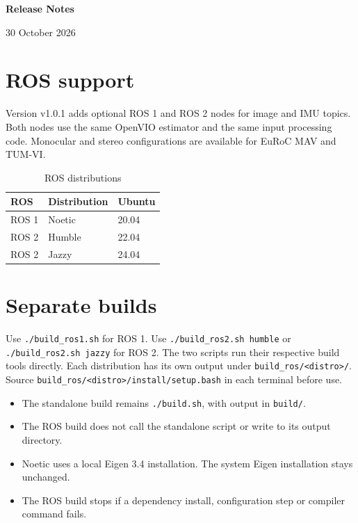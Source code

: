 \documentclass[10pt,a4paper]{article}
\begin{document}
\begin{center}
  {\LARGE\bfseries Release Notes}\par\vspace{3pt}
  {\small 30 October 2026}
\end{center}

\section{ROS support}
Version v1.0.1 adds optional ROS 1 and ROS 2 nodes for image and IMU topics. Both nodes use the same OpenVIO estimator
and the same input processing code. Monocular and stereo configurations are available for EuRoC MAV and TUM-VI.

\begin{table}[H]
\centering
\caption{ROS distributions}
\begin{tabular}{lll}
\hline\hline
ROS & Distribution & Ubuntu \\
\hline
ROS 1 & Noetic & 20.04 \\
ROS 2 & Humble & 22.04 \\
ROS 2 & Jazzy & 24.04 \\
\hline\hline
\end{tabular}
\end{table}

\section{Separate builds}
Use \texttt{./build\_ros1.sh} for ROS 1. Use \texttt{./build\_ros2.sh humble} or
\texttt{./build\_ros2.sh jazzy} for ROS 2. The two scripts run their respective build tools directly.
Each distribution has its own output under \texttt{build\_ros/<distro>/}. Source
\texttt{build\_ros/<distro>/install/setup.bash} in each terminal before use.

\begin{itemize}
\item The standalone build remains \texttt{./build.sh}, with output in \texttt{build/}.
\item The ROS build does not call the standalone script or write to its output directory.
\item Noetic uses a local Eigen 3.4 installation. The system Eigen installation stays unchanged.
\item The ROS build stops if a dependency install, configuration step or compiler command fails.
\end{itemize}
\end{document}
